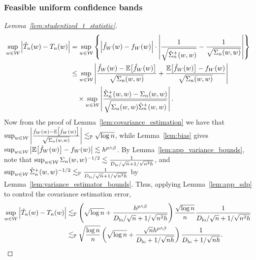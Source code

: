 \subsubsection{Feasible uniform confidence bands}

\begin{proof}[Lemma~\ref{lem:studentized_t_statistic}]

  \begin{align*}
    \sup_{w \in \mathcal{W}}
    \left| \hat T_n(w) - T_n(w) \right|
    &=
    \sup_{w \in \mathcal{W}}
    \left\{
      \left|
      \hat f_W(w) - f_W(w)
      \right|
      \cdot
      \left|
      \frac{1}
      {\sqrt{\hat\Sigma_n^+(w,w)}}
      -
      \frac{1}{\sqrt{\Sigma_n(w,w)}}
      \right|
    \right\} \\
    &\leq
    \sup_{w \in \mathcal{W}}
    \left|
    \frac{\hat f_W(w) - \mathbb{E}\big[\hat f_W(w)\big]}
    {\sqrt{\Sigma_n(w,w)}}
    + \frac{\mathbb{E}\big[\hat f_W(w)\big] - f_W(w)}
    {\sqrt{\Sigma_n(w,w)}}
    \right| \\
    &\quad\times
    \sup_{w \in \mathcal{W}}
    \left|
    \frac{\hat\Sigma_n^+(w,w) - \Sigma_n(w,w)}
    {\sqrt{\Sigma_n(w,w) \hat\Sigma_n^+(w,w)}}
    \right|.
  \end{align*}
  Now from the proof of Lemma~\ref{lem:covariance_estimation} we have that
  $\sup_{w \in \mathcal{W}} \left|
  \frac{\hat f_W(w) - \mathbb{E}\big[\hat f_W(w)\big]}
  {\sqrt{\Sigma_n(w,w)}} \right|
  \lesssim_{\mathbb{P}} \sqrt{\log n}$,
  while Lemma~\ref{lem:bias} gives
  $\sup_{w \in \mathcal{W}} \big| \mathbb{E}\big[\hat f_W(w)\big] - f_W(w) \big|
  \lesssim h^{p \wedge \beta}$.
  By Lemma~\ref{lem:app_variance_bounds},
  note that
  $\sup_{w \in \mathcal{W}} \Sigma_n(w,w)^{-1/2}
  \lesssim \frac{1}{D_{\textup{lo}}/\sqrt{n} + 1/\sqrt{n^2h}}$, and
  $\sup_{w \in \mathcal{W}} \hat \Sigma_n^+(w,w)^{-1/2}
  \lesssim_{\mathbb{P}} \frac{1}{D_{\textup{lo}}/\sqrt{n} + 1/\sqrt{n^2h}}$
  by Lemma~\ref{lem:variance_estimator_bounds}.
  Thus, applying Lemma~\ref{lem:app_sdp} to control the
  covariance estimation error,
  \begin{align*}
    \sup_{w \in \mathcal{W}}
    \left| \hat T_n(w) - T_n(w) \right|
    &\lesssim_{\mathbb{P}}
    \left(
      \sqrt{\log n} + \frac{h^{p \wedge \beta}}{D_{\textup{lo}}/\sqrt{n} + 1/\sqrt{n^2h}}
    \right)
    \frac{\sqrt{\log n}}{n}
    \frac{1}{D_{\textup{lo}}/\sqrt{n} + 1/\sqrt{n^2h}} \\
    &\lesssim_{\mathbb{P}}
    \sqrt{\frac{\log n}{n}}
    \left(
      \sqrt{\log n} + \frac{\sqrt n h^{p \wedge \beta}}
      {D_{\textup{lo}} + 1/\sqrt{n h}}
    \right)
    \frac{1}{D_{\textup{lo}} + 1/\sqrt{n h}}.
  \end{align*}
\end{proof}

